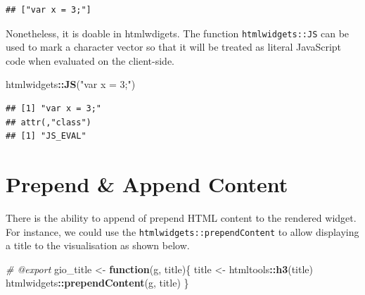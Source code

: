 \documentclass[
]{krantz}
\makeatletter
\newenvironment{Shaded}{\begin{snugshade}}{\end{snugshade}}
\newcommand{\CommentTok}[1]{\textcolor[rgb]{0.37,0.37,0.37}{\textit{#1}}}
\newcommand{\ControlFlowTok}[1]{\textcolor[rgb]{0.27,0.27,0.27}{\textbf{#1}}}
\newcommand{\KeywordTok}[1]{\textcolor[rgb]{0.27,0.27,0.27}{\textbf{#1}}}
\newcommand{\NormalTok}[1]{#1}
\newcommand{\OperatorTok}[1]{\textcolor[rgb]{0.43,0.43,0.43}{\textbf{#1}}}
\newcommand{\StringTok}[1]{\textcolor[rgb]{0.5,0.5,0.5}{#1}}
\newenvironment{kframe}{%
\medskip{}
\setlength{\fboxsep}{.8em}
 \def\at@end@of@kframe{}%
 \ifinner\ifhmode%
  \def\at@end@of@kframe{\end{minipage}}%
  \begin{minipage}{\columnwidth}%
 \fi\fi%
 \def\FrameCommand##1{\hskip\@totalleftmargin \hskip-\fboxsep
 \colorbox{shadecolor}{##1}\hskip-\fboxsep
     \hskip-\linewidth \hskip-\@totalleftmargin \hskip\columnwidth}%
 \MakeFramed {\advance\hsize-\width
   \@totalleftmargin\z@ \linewidth\hsize
   \@setminipage}}%
 {\par\unskip\endMakeFramed%
 \at@end@of@kframe}
\renewenvironment{Shaded}{\begin{kframe}}{\end{kframe}}
\makeatother
\begin{document}
\begin{verbatim}
## ["var x = 3;"]
\end{verbatim}

Nonetheless, it is doable in htmlwdigets. The function \texttt{htmlwidgets::JS} can be used to mark a character vector so that it will be treated as literal JavaScript code when evaluated on the client-side.

\begin{Shaded}
\begin{Highlighting}[]
\NormalTok{htmlwidgets}\OperatorTok{::}\KeywordTok{JS}\NormalTok{(}\StringTok{"var x = 3;"}\NormalTok{)  }
\end{Highlighting}
\end{Shaded}

\begin{verbatim}
## [1] "var x = 3;"
## attr(,"class")
## [1] "JS_EVAL"
\end{verbatim}

\hypertarget{prepend-append-content}{%
\section*{Prepend \& Append Content}\label{prepend-append-content}}


There is the ability to append of prepend HTML content to the rendered widget. For instance, we could use the \texttt{htmlwidgets::prependContent} to allow displaying a title to the visualisation as shown below.

\begin{Shaded}
\begin{Highlighting}[]
\CommentTok{\#\textquotesingle{} @export}
\NormalTok{gio\_title <{-}}\StringTok{ }\ControlFlowTok{function}\NormalTok{(g, title)\{}
\NormalTok{  title <{-}}\StringTok{ }\NormalTok{htmltools}\OperatorTok{::}\KeywordTok{h3}\NormalTok{(title)}
\NormalTok{  htmlwidgets}\OperatorTok{::}\KeywordTok{prependContent}\NormalTok{(g, title)}
\NormalTok{\}}
\end{Highlighting}
\end{Shaded}
\end{document}
